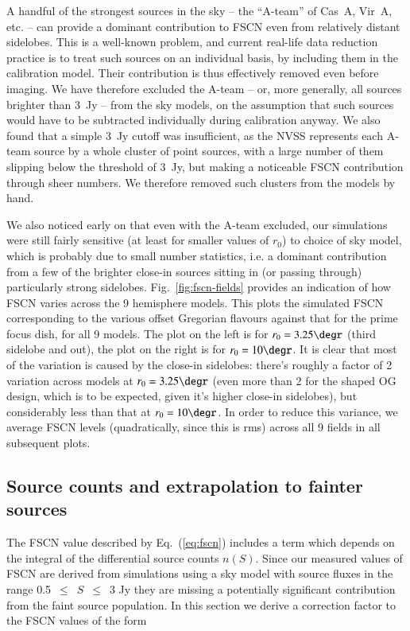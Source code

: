 \documentclass{aa}
\begin{document}
A handful of the strongest sources in the sky -- the ``A-team'' of  Cas~A, Vir~A, etc. -- can provide a dominant contribution to FSCN even from relatively distant sidelobes. This is a well-known problem, and current real-life data reduction practice is to treat such sources on an individual basis, by including them in the calibration model. Their contribution is thus effectively removed even before imaging. We have therefore excluded the A-team -- or, more generally, all sources brighter than 3~Jy -- from the sky models, on the assumption that such sources would have to be subtracted individually during calibration anyway. We also found that a simple 3~Jy cutoff was insufficient, as the NVSS represents each A-team source by a whole cluster of point sources, with a large number of them slipping below the threshold of 3~Jy, but making a noticeable FSCN contribution through sheer numbers. We therefore removed such clusters from the models by hand.

We also noticed early on that even with the A-team excluded, our simulations were still fairly sensitive (at least for smaller values of $r_0$) to choice of sky model, which is probably due to small number statistics, i.e. a dominant contribution from a few of the brighter close-in sources sitting in (or passing through) particularly strong sidelobes. Fig.~\ref{fig:fscn-fields} provides an indication of how FSCN varies across the 9 hemisphere models. This plots the simulated FSCN corresponding to the various offset Gregorian flavours against that for the prime focus dish, for all 9 models. The plot on the left is for $r_0=3.25\degr$ (third sidelobe and out), the plot on the right is for $r_0=10\degr$. It is clear that most of the variation is caused by the close-in sidelobes: there's roughly a factor of 2 variation across models at $r_0=3.25\degr$ (even more than 2 for the shaped OG design, which is to be expected, given it's higher close-in sidelobes), but considerably less than that at $r_0=10\degr$. In 
order to reduce this variance, we average FSCN levels (quadratically, since this is rms) across all 9 fields in all subsequent plots.

\subsection{Source counts and extrapolation to fainter sources}
\label{sec:source-counts}

The FSCN value described by Eq.~(\ref{eq:fscn}) includes a term which depends on the integral of the differential source counts $n(S)$. Since our measured values of FSCN are derived from simulations using a sky model with source fluxes in the range 0.5~$\leq$~$S$~$\leq$~3 Jy they are missing a potentially significant contribution from the faint source population. In this section we derive a correction factor to the FSCN values of the form
\end{document}
